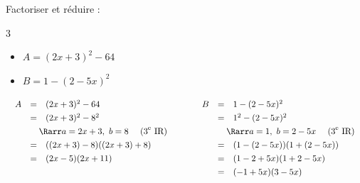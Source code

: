 \begin{methode}
	Factoriser et réduire :
	\begin{multicols}{3}
		\begin{itemize}
			\item $A = (2x + 3)^2 - 64$
			\item $B = 1 - (2 - 5x)^2$
		\end{itemize}
	\end{multicols}

	\begin{correction}
		\[
			\begin{array}{ll}%
				\def\arraystretch{1.3}%
				\begin{array}{rcl}%
					A & =                                                                               & (2x + 3)^2 - 64              \\
					  & =                                                                               & (2x + 3)^2 - 8^2             \\
					  & \multicolumn{2}{l}{\quad\Rarr a=2x+3,\ b=8 \quad\text{ (3}^\text{e}\text{ IR)}}                                \\
					  & =                                                                               & ((2x + 3) - 8)((2x + 3) + 8) \\
					  & =                                                                               & (2x - 5)(2x + 11)            \\
					  &                                                                                 &                              \\
				\end{array} \quad & \quad %
				\def\arraystretch{1.3}%
				\begin{array}{rcl}%
					B & =                                                                               & 1 - (2 - 5x)^2               \\
					  & =                                                                               & 1^2 - (2 - 5x)^2             \\
					  & \multicolumn{2}{l}{\quad\Rarr a=1,\ b=2-5x \quad\text{ (3}^\text{e}\text{ IR)}}                                \\
					  & =                                                                               & (1 - (2 - 5x))(1 + (2 - 5x)) \\
					  & =                                                                               & (1 - 2 + 5x)(1 + 2 - 5x)     \\
					  & =                                                                               & (-1 + 5x)(3 - 5x)            \\
				\end{array}%
			\end{array}%
		\]
	\end{correction}
\end{methode}

